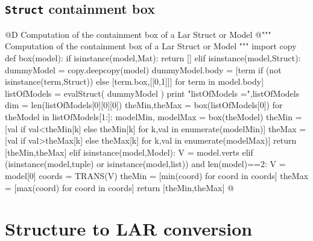 \documentclass[11pt,oneside]{article}    %
\begin{document}
\subsection{\texttt{Struct} containment box}

@D Computation of the containment box of a Lar Struct or Model
@{""" Computation of the containment box of a Lar Struct or Model """
import copy
def box(model):
    if isinstance(model,Mat): return []
    elif isinstance(model,Struct):
        dummyModel = copy.deepcopy(model)
        dummyModel.body = [term if (not isinstance(term,Struct)) else [term.box,[[0,1]]]  for term in model.body]
        listOfModels = evalStruct( dummyModel )
        print "listOfModels =",listOfModels
        dim = len(listOfModels[0][0][0])
        theMin,theMax = box(listOfModels[0]) 
        for theModel in listOfModels[1:]:
            modelMin, modelMax = box(theModel)
            theMin = [val if val<theMin[k] else theMin[k] for k,val in enumerate(modelMin)]
            theMax = [val if val>theMax[k] else theMax[k] for k,val in enumerate(modelMax)]
        return [theMin,theMax]
    elif isinstance(model,Model):
        V = model.verts
    elif (isinstance(model,tuple) or isinstance(model,list)) and len(model)==2:
        V = model[0]
    coords = TRANS(V)
    theMin = [min(coord) for coord in coords]
    theMax = [max(coord) for coord in coords]
    return [theMin,theMax]
@}


\section{Structure to LAR conversion}
\end{document}
